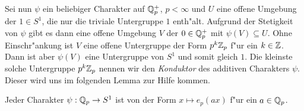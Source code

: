 		Sei nun $\psi$ ein beliebiger Charakter auf $\mathbb{Q}_p^+$, $p<\infty$ und $U$ eine offene Umgebung der $1 \in S^1$, die nur die triviale Untergruppe $1$ enth"alt. 
		Aufgrund der Stetigkeit von $\psi$ gibt es dann eine offene Umgebung $V$ der $0\in\mathbb{Q}_p^+$ mit $\psi(V)\subseteq U$. 
		Ohne Einschr"ankung ist $V$ eine offene Untergruppe der Form $p^k{\mathbb{Z}_p}$ f"ur ein $k\in\mathbb{Z}$. 
		Dann ist aber $\psi(V)$ eine Untergruppe von $S^1$ und somit gleich $1$.
		Die kleinste solche Untergruppe $p^k{\mathbb{Z}_p}$ nennen wir den \emph{Konduktor} des additiven Charakters $\psi$. %
		Dieser wird uns im folgenden Lemma zur Hilfe kommen.
	
		\begin{lemma}\label{lemma:lokal:genericchar}
			Jeder Charakter $\psi: {\mathbb{Q}_p} \to S^1$ ist von der Form $x \mapsto e_p(ax)$ f"ur ein $a \in {\mathbb{Q}_p}$.
		\end{lemma}
